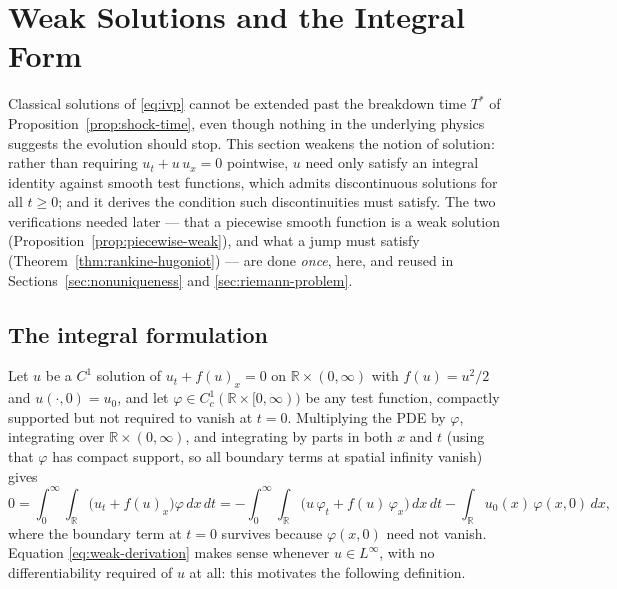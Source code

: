 
\section{Weak Solutions and the Integral Form}
\label{sec:weak-solutions}

Classical solutions of \eqref{eq:ivp} cannot be extended past the breakdown
time $T^*$ of Proposition~\ref{prop:shock-time}, even though nothing in the
underlying physics suggests the evolution should stop. This section weakens
the notion of solution: rather than requiring $u_t+u\,u_x=0$ pointwise, $u$
need only satisfy an integral identity against smooth test functions, which
admits discontinuous solutions for all $t\ge0$; and it derives the condition
such discontinuities must satisfy. The two
verifications needed later --- that a piecewise smooth function is a weak
solution (Proposition~\ref{prop:piecewise-weak}), and what a jump must
satisfy (Theorem~\ref{thm:rankine-hugoniot}) --- are done \emph{once},
here, and reused in Sections~\ref{sec:nonuniqueness} and
\ref{sec:riemann-problem}.

\subsection{The integral formulation}
\label{subsec:integral-form}

Let $u$ be a $C^1$ solution of $u_t + f(u)_x = 0$ on $\mathbb{R} \times
(0,\infty)$ with $f(u)=u^2/2$ and $u(\cdot,0)=u_0$, and let $\varphi \in
C_c^1(\mathbb{R} \times [0,\infty))$ be any test function, compactly
supported but not required to vanish at $t=0$. Multiplying the PDE by
$\varphi$, integrating over $\mathbb{R}\times(0,\infty)$, and integrating
by parts in both $x$ and $t$ (using that $\varphi$ has compact support, so
all boundary terms at spatial infinity vanish) gives
\begin{equation}
  \label{eq:weak-derivation}
  0 = \int_0^\infty\!\!\int_{\mathbb{R}} \big(u_t + f(u)_x\big)\varphi\, dx\, dt
  = -\int_0^\infty\!\!\int_{\mathbb{R}} \big(u\,\varphi_t + f(u)\,\varphi_x\big)\, dx\, dt
  - \int_{\mathbb{R}} u_0(x)\, \varphi(x,0)\, dx,
\end{equation}
where the boundary term at $t=0$ survives because $\varphi(x,0)$ need not
vanish. Equation \eqref{eq:weak-derivation} makes sense whenever $u \in
L^\infty$, with no differentiability required of $u$ at all: this
motivates the following definition.

